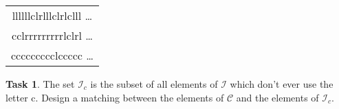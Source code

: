 \documentclass[12pt]{amsart}
\theoremstyle{definition}
\newtheorem{task}{Task}
\begin{document}
\begin{center}
\begin{tabular}{c}
llllllclrlllclrlclll \dots \\[.2cm]
cclrrrrrrrrrlclrl \dots \\[.2cm]
ccccccccclccccc \dots \\[.5cm]
\end{tabular}
\end{center}


\begin{task}
The set $\mathcal{I}_c$ is the subset of all elements of $\mathcal{I}$ which don't ever use the letter c. Design a matching between the elements of $\mathcal{C}$ and the elements of $\mathcal{I}_c$.
\end{task}
\end{document}
